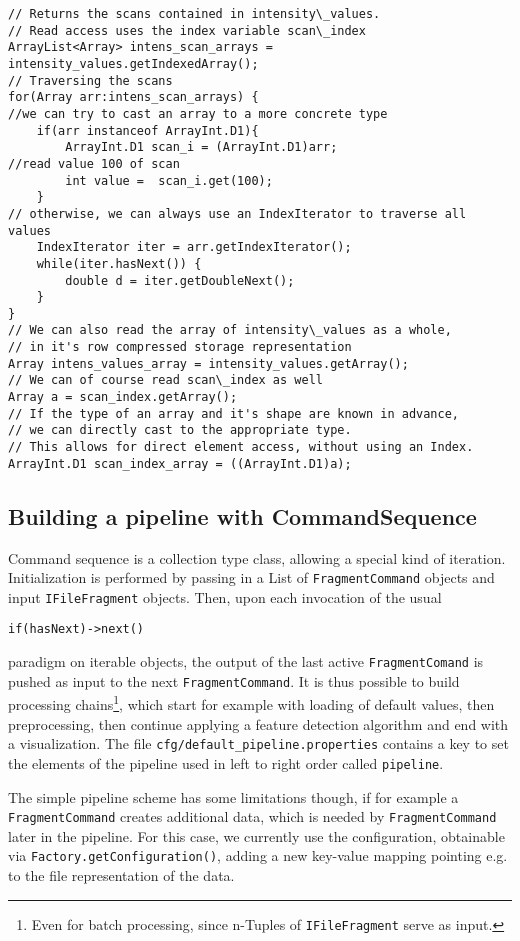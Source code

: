 \documentclass[a4paper,10pt]{article}
\begin{document}
\begin{lstlisting}
// Returns the scans contained in intensity\_values. 
// Read access uses the index variable scan\_index
ArrayList<Array> intens_scan_arrays = intensity_values.getIndexedArray();
// Traversing the scans
for(Array arr:intens_scan_arrays) {
//we can try to cast an array to a more concrete type
	if(arr instanceof ArrayInt.D1){
		ArrayInt.D1 scan_i = (ArrayInt.D1)arr;
//read value 100 of scan
		int value =  scan_i.get(100);
	}
// otherwise, we can always use an IndexIterator to traverse all values
	IndexIterator iter = arr.getIndexIterator();
	while(iter.hasNext()) {
		double d = iter.getDoubleNext();
	}
}
// We can also read the array of intensity\_values as a whole, 
// in it's row compressed storage representation
Array intens_values_array = intensity_values.getArray();
// We can of course read scan\_index as well
Array a = scan_index.getArray();
// If the type of an array and it's shape are known in advance, 
// we can directly cast to the appropriate type.
// This allows for direct element access, without using an Index.
ArrayInt.D1 scan_index_array = ((ArrayInt.D1)a);
\end{lstlisting}


\subsection{Building a pipeline with CommandSequence}
Command sequence is a collection type class, allowing a special kind of iteration.
Initialization is performed by passing in a List of \texttt{FragmentCommand} objects and input \texttt{IFileFragment} objects.
Then, upon each invocation of the usual 

\texttt{if(hasNext)->next()}

paradigm on iterable objects, the output of the last active \texttt{FragmentComand} is pushed as input to the next \texttt{FragmentCommand}. It is thus possible to build processing 
chains\footnote{Even for batch processing, since n-Tuples of \texttt{IFileFragment} serve as input.}, which start for example with loading of default values, then preprocessing, then continue applying a feature detection algorithm and end with a visualization.
The file \texttt{cfg/default\_pipeline.properties} contains a key to set the
elements of the pipeline used in left to right order called \texttt{pipeline}.

The simple pipeline scheme has some limitations though, if for example a \texttt{FragmentCommand} creates additional data, which is needed by \texttt{FragmentCommand} later in the pipeline. For this case, we currently use the configuration, obtainable via \texttt{Factory.getConfiguration()}, adding a new key-value mapping pointing e.g. to the file representation of the data.  
\end{document}

